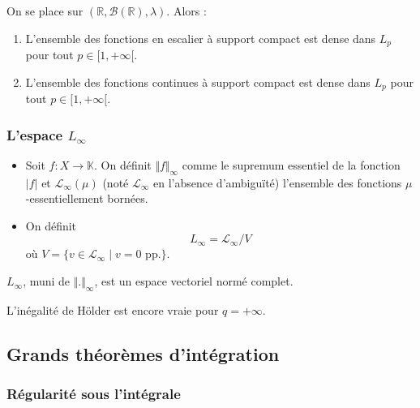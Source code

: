   \begin{theorem}
    On se place sur $(\mathbb{R}, \mathcal{B}(\mathbb{R}), \lambda)$. Alors :
    \begin{enumerate}[label=(\roman*)]
      \item L'ensemble des fonctions en escalier à support compact est dense dans $L_p$ pour tout $p \in [1, +\infty[$.
      \item L'ensemble des fonctions continues à support compact est dense dans $L_p$ pour tout $p \in [1, +\infty[$.
    \end{enumerate}
  \end{theorem}

  \subsubsection{L'espace \texorpdfstring{$L_\infty$}{L∞}}


  \begin{definition}
    \begin{itemize}
      \item Soit $f : X \rightarrow \mathbb{K}$. On définit $\Vert f \Vert_\infty$  comme le supremum essentiel de la fonction $\vert f \vert$ et $\mathcal{L}_\infty(\mu)$ (noté $\mathcal{L}_\infty$ en l'absence d'ambiguïté) l'ensemble des fonctions $\mu$-essentiellement bornées.
      \item On définit
      \[ L_\infty = \mathcal{L}_\infty / V \]
      où $V = \{ v \in \mathcal{L}_\infty \mid v = 0 \text{ pp.} \}$.
    \end{itemize}
  \end{definition}

  \begin{theorem}
    $L_\infty$, muni de $\Vert . \Vert_\infty$, est un espace vectoriel normé complet.
  \end{theorem}

  \begin{remark}
    L'inégalité de Hölder est encore vraie pour $q = +\infty$.
  \end{remark}

  \subsection{Grands théorèmes d'intégration}

  \subsubsection{Régularité sous l'intégrale}


